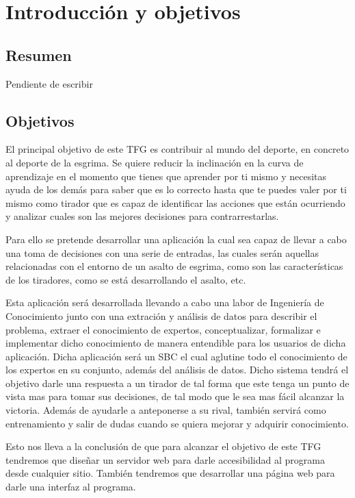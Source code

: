 \chapter{Introducción y objetivos}
\label{cap: Introducción y objetivos}


\section{Resumen}
Pendiente de escribir

\section{Objetivos}

El principal objetivo de este TFG es contribuir al mundo del deporte, en concreto al
 deporte de la esgrima. Se quiere reducir la inclinación en la curva de aprendizaje
 en el momento que tienes que aprender por ti mismo y necesitas ayuda de los demás
 para saber que es lo correcto hasta que te puedes valer por ti mismo como tirador
 que es capaz de identificar las acciones que están ocurriendo y analizar cuales son las mejores
 decisiones para contrarrestarlas.

Para ello se pretende desarrollar una aplicación la cual sea capaz de llevar a
 cabo una toma de decisiones con una serie de entradas, las cuales serán aquellas
 relacionadas con el entorno de un asalto de esgrima, como son las características
 de los tiradores, como se está desarrollando el asalto, etc.

Esta aplicación será desarrollada llevando a cabo una labor de Ingeniería de Conocimiento
 junto con una extración y análisis de datos para describir el problema, extraer
 el conocimiento de expertos, conceptualizar, formalizar e implementar dicho conocimiento
 de manera entendible para los usuarios de dicha aplicación. Dicha aplicación será un SBC
 el cual aglutine todo el conocimiento de los expertos en su conjunto, además del análisis
 de datos. Dicho sistema tendrá el objetivo darle una respuesta a un tirador de tal forma
 que este tenga un punto de vista mas para tomar sus decisiones, de tal modo que le sea mas
 fácil alcanzar la victoria. Además de ayudarle a anteponerse a su rival, también servirá
 como entrenamiento y salir de dudas cuando se quiera mejorar y adquirir conocimiento.

Esto nos lleva a la conclusión de que para alcanzar el objetivo de este TFG tendremos
 que diseñar un servidor web para darle accesibilidad al programa desde cualquier sitio.
 También tendremos que desarrollar una página web para darle una interfaz al programa.

